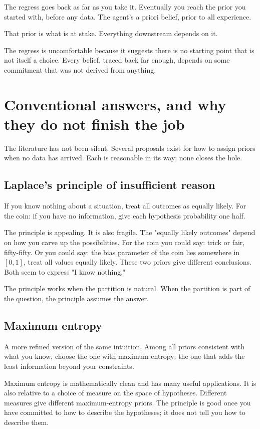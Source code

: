 The regress goes back as far as you take it. Eventually you reach the prior you started with, before any data. The agent's a priori belief, prior to all experience.

That prior is what is at stake. Everything downstream depends on it.

The regress is uncomfortable because it suggests there is no starting point that is not itself a choice. Every belief, traced back far enough, depends on some commitment that was not derived from anything.

\section*{Conventional answers, and why they do not finish the job}

The literature has not been silent. Several proposals exist for how to assign priors when no data has arrived. Each is reasonable in its way; none closes the hole.

\subsection*{Laplace's principle of insufficient reason}

If you know nothing about a situation, treat all outcomes as equally likely. For the coin: if you have no information, give each hypothesis probability one half.

The principle is appealing. It is also fragile. The "equally likely outcomes" depend on how you carve up the possibilities. For the coin you could say: trick or fair, fifty-fifty. Or you could say: the bias parameter of the coin lies somewhere in $[0, 1]$, treat all values equally likely. These two priors give different conclusions. Both seem to express "I know nothing."

The principle works when the partition is natural. When the partition is part of the question, the principle assumes the answer.

\subsection*{Maximum entropy}

A more refined version of the same intuition. Among all priors consistent with what you know, choose the one with maximum entropy: the one that adds the least information beyond your constraints.

Maximum entropy is mathematically clean and has many useful applications. It is also relative to a choice of measure on the space of hypotheses. Different measures give different maximum-entropy priors. The principle is good once you have committed to how to describe the hypotheses; it does not tell you how to describe them.

